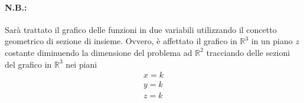 \paragraph{N.B.:} Sarà trattato il grafico delle funzioni in due variabili utilizzando il concetto geometrico di sezione di insieme. Ovvero, è affettato il grafico in $\mathbb R^3$ in un piano $z$ costante diminuendo la dimensione del problema ad $\mathbb R^2$ tracciando delle sezioni del grafico in $\mathbb R^3$ nei piani
\begin{equation}\label{eq:piani}
    \begin{matrix}
        x=k\\
        y=k\\
        z=k
    \end{matrix}
\end{equation}

